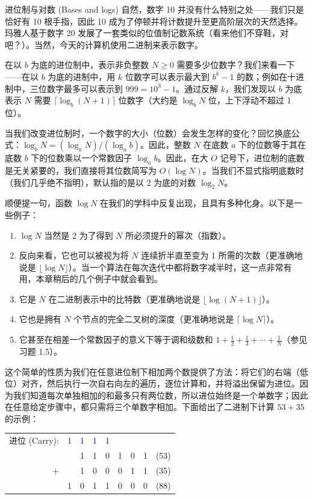 \begin{sidebarbox}{进位制与对数 (Bases and logs)}
自然，数字 10 并没有什么特别之处——我们只是恰好有 10 根手指，因此 10 成为了停顿并将计数提升至更高阶层次的天然选择。玛雅人基于数字 20 发展了一套类似的位值制记数系统（看来他们不穿鞋，对吧？）。当然，今天的计算机使用二进制来表示数字。

在以 $b$ 为底的进位制中，表示非负整数 $N \ge 0$ 需要多少位数字？我们来看一下——在以 $b$ 为底的进制中，用 $k$ 位数字可以表示最大到 $b^k - 1$ 的数；例如在十进制中，三位数字最多可以表示到 $999 = 10^3 - 1$。通过反解 $k$，我们发现以 $b$ 为底表示 $N$ 需要 $\lceil \log_b (N + 1) \rceil$ 位数字（大约是 $\log_b N$ 位，上下浮动不超过 1 位）。

当我们改变进位制时，一个数字的大小（位数）会发生怎样的变化？回忆换底公式：$\log_b N = (\log_a N) / (\log_a b)$。因此，整数 $N$ 在底数 $a$ 下的位数等于其在底数 $b$ 下的位数乘以一个常数因子 $\log_a b$。因此，在大 $O$ 记号下，进位制的底数是无关紧要的，我们直接将其位数简写为 $O(\log N)$。当我们不显式指明底数时（我们几乎绝不指明），默认指的是以 2 为底的对数 $\log_2 N$。

顺便提一句，函数 $\log N$ 在我们的学科中反复出现，且具有多种化身。以下是一些例子：
\begin{enumerate}
    \item $\log N$ 当然是 2 为了得到 $N$ 所必须提升的幂次（指数）。
    \item 反向来看，它也可以被视为将 $N$ 连续折半直至变为 1 所需的次数（更准确地说是 $\lfloor \log N \rfloor$）。当一个算法在每次迭代中都将数字减半时，这一点非常有用，本章稍后的几个例子中就会看到。
    \item 它是 $N$ 在二进制表示中的比特数（更准确地说是 $\lfloor \log(N + 1) \rfloor$）。
    \item 它也是拥有 $N$ 个节点的完全二叉树的深度（更准确地说是 $\lceil \log N \rceil$）。
    \item 它甚至在相差一个常数因子的意义下等于调和级数和 $1 + \frac{1}{2} + \frac{1}{3} + \cdots + \frac{1}{N}$（参见习题 1.5）。
\end{enumerate}
\end{sidebarbox}

这个简单的性质为我们在任意进位制下相加两个数提供了方法：将它们的右端（低位）对齐，然后执行一次自右向左的遍历，逐位计算和，并将溢出保留为进位。因为我们知道每次单独相加的和最多只有两位数，所以进位始终是一个单数字；因此在任意给定步骤中，都只需将三个单数字相加。下面给出了二进制下计算 $53 + 35$ 的示例：

\begin{center}
\begin{tabular}{rcccccccl}
进位 (Carry): & \textcolor{blue}{1} & \textcolor{blue}{1} & \textcolor{blue}{1} & \textcolor{blue}{1} & & & \\
& & 1 & 1 & 0 & 1 & 0 & 1 & (53) \\
$+$ & & 1 & 0 & 0 & 0 & 1 & 1 & (35) \\
\hline
& 1 & 0 & 1 & 1 & 0 & 0 & 0 & (88)
\end{tabular}
\end{center}


